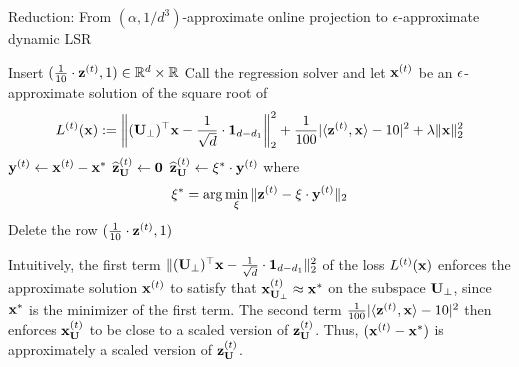 \begin{algorithm}[!htbp]
\caption{Reduction: From $(\alpha, 1/d^3)$-approximate online projection to $\epsilon$-approximate dynamic LSR}
\label{algo:reduction}
\begin{algorithmic}[1]
\State Insert $(\frac{1}{10}\cdot\mathbf{z}^{(t)}, 1) \in \mathbb{R}^{d}\times \mathbb{R}$ 
\State Call the regression solver and let $\mathbf{x}^{{(t)}}$ be an $\epsilon$-approximate solution of the square root of \label{line:regression}
\begin{align}
L^{(t)}(\mathbf{x}) := \left\|(\mathbf{U}_{\perp})^\top\mathbf{x} - \frac{1}{\sqrt{d}} \cdot \mathbf{1}_{d-d_1}\right\|_2^2 + \frac{1}{100}|\langle \mathbf{z}^{(t)}, \mathbf{x}\rangle - 10|^2 + \lambda \|\mathbf{x}\|_2^2   \label{eq:lsr-r}
\end{align}
\State $\mathbf{y}^{(t)} \leftarrow \mathbf{x}^{{(t)}} - \mathbf{x}^{*}$ \label{line:y-rt}
\label{line:termination}
\State \Return $\widehat{\mathbf{z}}_{\mathbf{U}}^{(t)} \leftarrow \mathbf{0}$ 
\Else
\State \Return $\widehat{\mathbf{z}}_{\mathbf{U}}^{(t)} \leftarrow \xi^{*} \cdot \mathbf{y}^{(t)}$ where \label{line:interpolation}
\begin{align}
\xi^{*} = \arg\min_{\xi} \|\mathbf{z}^{(t)} - \xi \cdot \mathbf{y}^{(t)}\|_2 \label{eq:interpolation}
\end{align}
\EndIf
\State Delete the row $(\frac{1}{10}\cdot\mathbf{z}^{(t)}, 1)$ 
\end{algorithmic}
\end{algorithm}

Intuitively, the first term $\|(\mathbf{U}_{\perp})^\top\mathbf{x} - \frac{1}{\sqrt{d}} \cdot \mathbf{1}_{d-d_1}\|_2^2$ of the loss $L^{(t)}(\mathbf{x})$ enforces the approximate solution $\mathbf{x}^{(t)}$ to satisfy that $\mathbf{x}^{(t)}_{\mathbf{U}_{\perp}} \approx \mathbf{x}^*$ on the subspace $\mathbf{U}_{\perp}$, since $\mathbf{x}^*$ is the minimizer of the first term. The second term $\frac{1}{100}|\langle \mathbf{z}^{(t)}, \mathbf{x}\rangle - 10|^2$ then enforces $\mathbf{x}^{(t)}_{\mathbf{U}}$ to be close to a scaled version of $\mathbf{z}^{(t)}_{\mathbf{U}}$. Thus, $(\mathbf{x}^{(t)} - \mathbf{x}^*)$ is approximately a scaled version of $\mathbf{z}^{(t)}_{\mathbf{U}}$.




